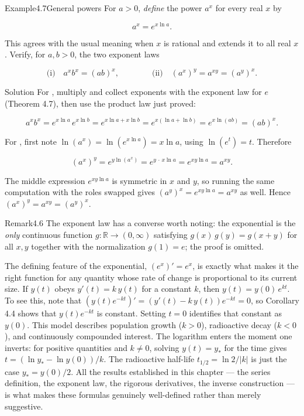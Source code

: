 \documentclass[a4paper,12pt,oneside]{memoir}
\begin{document}
\begin{workedexample}
\begin{envexample}{Example}{4.7}{General powers}
For \(a > 0\), \emph{define} the power \(a^{x}\) for every real \(x\) by

\[ a^{x} = e^{x \ln a}. \]

This agrees with the usual meaning when \(x\) is rational and extends it to all real \(x\). Verify, for \(a, b > 0\), the two exponent laws

\[ \text{(i)}\quad a^{x} b^{x} = (ab)^{x}, \qquad\qquad \text{(ii)}\quad (a^{x})^{y} = a^{xy} = (a^{y})^{x}. \]
\end{envexample}
\begin{envsolution}{Solution}{}{}
For , multiply and collect exponents with the exponent law for \(e\) (Theorem 4.7), then use the product law just proved:

\[ a^{x} b^{x} = e^{x \ln a}\, e^{x \ln b} = e^{x \ln a + x \ln b} = e^{x(\ln a + \ln b)} = e^{x \ln(ab)} = (ab)^{x}. \]

For , first note \(\ln(a^{x}) = \ln\!\left(e^{x \ln a}\right) = x \ln a\), using \(\ln(e^{t}) = t\). Therefore

\[ (a^{x})^{y} = e^{y \ln(a^{x})} = e^{y \,\cdot\, x \ln a} = e^{xy \ln a} = a^{xy}. \]

The middle expression \(e^{xy \ln a}\) is symmetric in \(x\) and \(y\), so running the same computation with the roles swapped gives \((a^{y})^{x} = e^{xy \ln a} = a^{xy}\) as well. Hence \((a^{x})^{y} = a^{xy} = (a^{y})^{x}\). \qedmark
\end{envsolution}
\end{workedexample}
\begin{envremark}{Remark}{4.6}{}
The exponent law has a converse worth noting: the exponential is the \emph{only} continuous function \(g \colon \mathbb{R} \to (0, \infty)\) satisfying \(g(x)\,g(y) = g(x + y)\) for all \(x, y\) together with the normalization \(g(1) = e\); the proof is omitted.
\end{envremark}
The defining feature of the exponential, \((e^{x})' = e^{x}\), is exactly what makes it the right function for any quantity whose rate of change is proportional to its current size. If \(y(t)\) obeys \(y'(t) = k\,y(t)\) for a constant \(k\), then \(y(t) = y(0)\,e^{kt}\). To see this, note that \((y(t)e^{-kt})' = (y'(t) - k\,y(t))e^{-kt} = 0\), so Corollary 4.4 shows that \(y(t)e^{-kt}\) is constant. Setting \(t = 0\) identifies that constant as \(y(0)\). This model describes population growth (\(k > 0\)), radioactive decay (\(k < 0\)), and continuously compounded interest. The logarithm enters the moment one inverts: for positive quantities and \(k \ne 0\), solving \(y(t) = y_{\ast}\) for the time gives \(t = (\ln y_{\ast} - \ln y(0))/k\). The radioactive half-life \(t_{1/2} = \ln 2 / \lvert k \rvert\) is just the case \(y_{\ast} = y(0)/2\). All the results established in this chapter — the series definition, the exponent law, the rigorous derivatives, the inverse construction — is what makes these formulas genuinely well-defined rather than merely suggestive.
\end{document}
